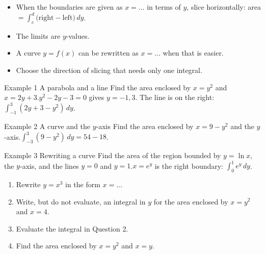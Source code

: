 \documentclass[11pt]{article}
\begin{document}

\begin{ideabox}
\begin{itemize}[leftmargin=*,itemsep=2pt,topsep=2pt]
  \item When the boundaries are given as $x=\ldots$ in terms of $y$, slice horizontally: area $=\displaystyle\int_{c}^{d}\big(\text{right}-\text{left}\big)\,dy$.
  \item The limits are $y$-values.
  \item A curve $y=f(x)$ can be rewritten as $x=\ldots$ when that is easier.
  \item Choose the direction of slicing that needs only one integral.
\end{itemize}
\end{ideabox}

\begin{example}{Example 1 \textperiodcentered{} A parabola and a line}
Find the area enclosed by $x=y^2$ and $x=2y+3$.\soln $y^2-2y-3=0$ gives $y=-1,3$. The line is on the right: $\displaystyle\int_{-1}^{3}(2y+3-y^2)\,dy$.
\end{example}

\begin{example}{Example 2 \textperiodcentered{} A curve and the $y$-axis}
Find the area enclosed by $x=9-y^2$ and the $y$-axis.\soln $\displaystyle\int_{-3}^{3}(9-y^2)\,dy=54-18$.
\end{example}

\begin{example}{Example 3 \textperiodcentered{} Rewriting a curve}
Find the area of the region bounded by $y=\ln x$, the $y$-axis, and the lines $y=0$ and $y=1$.\soln $x=e^{y}$ is the right boundary: $\displaystyle\int_{0}^{1}e^{y}\,dy$.
\end{example}

\newpage
{}

\begin{enumerate}[leftmargin=*,itemsep=2pt]
  \item Rewrite $y=x^3$ in the form $x=\ldots$\work{2.3cm}
  \item Write, but do not evaluate, an integral in $y$ for the area enclosed by $x=y^2$ and $x=4$.\work{2.3cm}
  \item Evaluate the integral in Question 2.\work{2.3cm}
  \item Find the area enclosed by $x=y^2$ and $x=y$.\work{2.3cm}
\end{enumerate}
\end{document}
